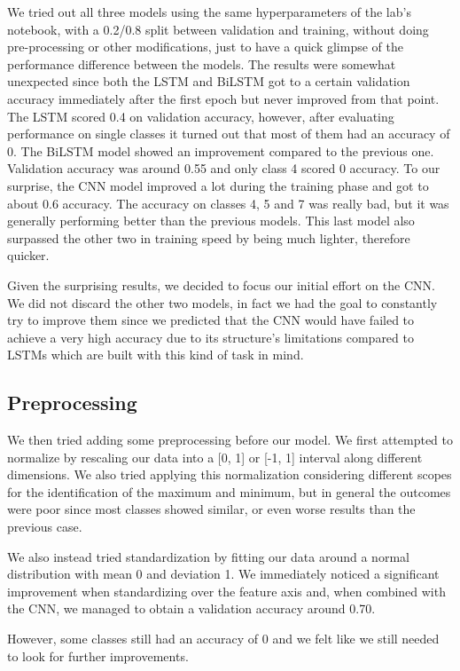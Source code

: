 \documentclass[11pt]{report}
\begin{document}
We tried out all three models using the same hyperparameters of the lab's notebook, with a 0.2/0.8 split between validation and training, without doing pre-processing or other modifications, just to have a quick glimpse of the performance difference between the models.
The results were somewhat unexpected since both the LSTM and BiLSTM got to a certain validation accuracy immediately after the first epoch but never improved from that point.
The LSTM scored 0.4 on validation accuracy, however, after evaluating performance on single classes it turned out that most of them had an accuracy of 0.
The BiLSTM model showed an improvement compared to the previous one.
Validation accuracy was around 0.55 and only class 4 scored 0 accuracy.
To our surprise, the CNN model improved a lot during the training phase and got to about 0.6 accuracy.
The accuracy on classes 4, 5 and 7 was really bad, but it was generally performing better than the previous models.
This last model also surpassed the other two in training speed by being much lighter, therefore quicker.

Given the surprising results, we decided to focus our initial effort on the CNN.
We did not discard the other two models, in fact we had the goal to constantly try to improve them since we predicted that the CNN would have failed to achieve a very high accuracy due to its structure's limitations compared to LSTMs which are built with this kind of task in mind.

\subsection{Preprocessing}
We then tried adding some preprocessing before our model.
We first attempted to normalize by rescaling our data into a [0, 1] or [-1, 1] interval along different dimensions.
We also tried applying this normalization considering different scopes for the identification of the maximum and minimum, but in general the outcomes were poor since most classes showed similar, or even worse results than the previous case.

We also instead tried standardization by fitting our data around a normal distribution with mean 0 and deviation 1.
We immediately noticed a significant improvement when standardizing over the feature axis and, when combined with the CNN, we managed to obtain a validation accuracy around 0.70.

However, some classes still had an accuracy of 0 and we felt like we still needed to look for further improvements.
\end{document}
